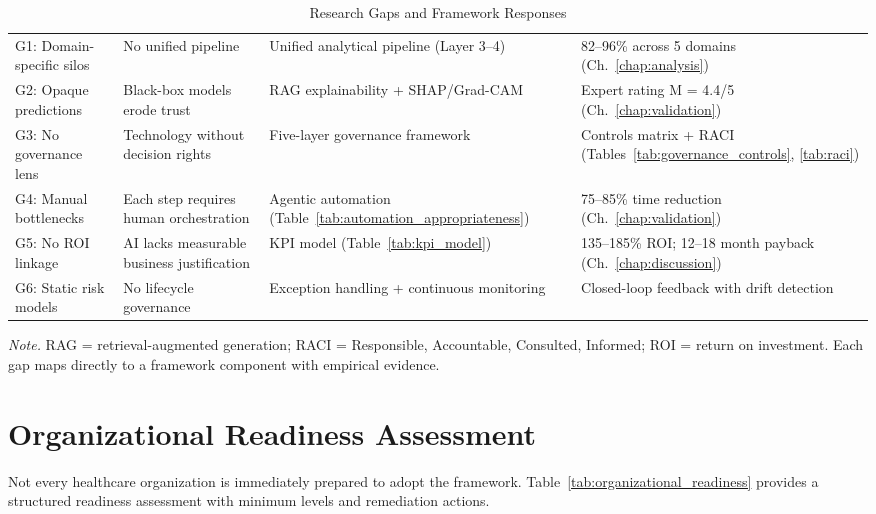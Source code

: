 \begin{table}[H]
\tablestripes
\small
\begin{tabularx}{\textwidth}{L L L L}
\toprule
{} &  &  &  \\
\midrule
G1: Domain-specific silos & No unified pipeline & Unified analytical pipeline (Layer 3--4) & 82--96\% across 5 domains (Ch.~\ref{chap:analysis}) \\
\addlinespace
G2: Opaque predictions & Black-box models erode trust & RAG explainability + SHAP/Grad-CAM & Expert rating M = 4.4/5 (Ch.~\ref{chap:validation}) \\
\addlinespace
G3: No governance lens & Technology without decision rights & Five-layer governance framework & Controls matrix + RACI (Tables~\ref{tab:governance_controls}, \ref{tab:raci}) \\
\addlinespace
G4: Manual bottlenecks & Each step requires human orchestration & Agentic automation (Table~\ref{tab:automation_appropriateness}) & 75--85\% time reduction (Ch.~\ref{chap:validation}) \\
\addlinespace
G5: No ROI linkage & AI lacks measurable business justification & KPI model (Table~\ref{tab:kpi_model}) & 135--185\% ROI; 12--18 month payback (Ch.~\ref{chap:discussion}) \\
\addlinespace
G6: Static risk models & No lifecycle governance & Exception handling + continuous monitoring & Closed-loop feedback with drift detection \\
\bottomrule
\end{tabularx}
\caption{Research Gaps and Framework Responses}
\label{tab:gap_framework_response}
\vspace{0.5em}\noindent\textit{Note.} RAG = retrieval-augmented generation; RACI = Responsible, Accountable, Consulted, Informed; ROI = return on investment. Each gap maps directly to a framework component with empirical evidence.
\end{table}

\section{Organizational Readiness Assessment}
\label{sec:fw_readiness}

Not every healthcare organization is immediately prepared to adopt the framework. Table~\ref{tab:organizational_readiness} provides a structured readiness assessment with minimum levels and remediation actions.

